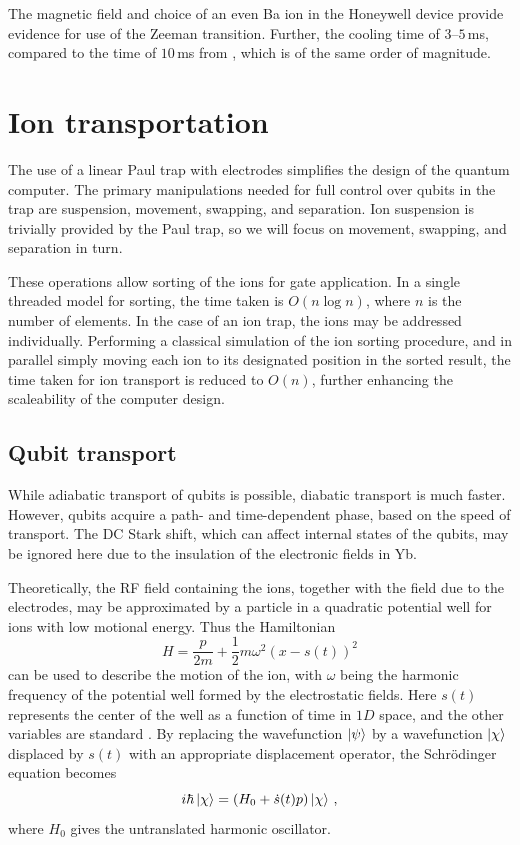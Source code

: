\documentclass[12pt,a4paper]{amsart}
\numberwithin{equation}{section}
\theoremstyle{plain}
\theoremstyle{definition}
\begin{document}
The magnetic field and choice of an even Ba ion in the Honeywell device provide evidence for use of the Zeeman transition. Further, the cooling time of $3$--$5\,$ms, compared to the time of $10\,$ms from \cite{rareEartCool}, which is of the same order of magnitude.



\section{Ion transportation}


The use of a linear Paul trap with electrodes simplifies the design of the quantum computer. The primary manipulations needed for full control over qubits in the trap are suspension, movement, swapping, and separation. Ion suspension is trivially provided by the Paul trap, so we will focus on movement, swapping, and separation in turn.


These operations allow sorting of the ions for gate application. In a single threaded model for sorting, the time taken is $O(n\log n)$, where $n$ is the number of elements. In the case of an ion trap, the ions may be addressed individually. Performing a classical simulation of the ion sorting procedure, and in parallel simply moving each ion to its designated position in the sorted result, the time taken for ion transport is reduced to $O(n)$, further enhancing the scaleability of the computer design.


\subsection{Qubit transport}


While adiabatic transport of qubits is possible, diabatic transport is much faster. However, qubits acquire a path- and time-dependent phase, based on the speed of transport. The DC Stark shift, which can affect internal states of the qubits, may be ignored here due to the insulation of the electronic fields in Yb.


Theoretically, the RF field containing the ions, together with the field due to the electrodes, may be approximated by a particle in a quadratic potential well for ions with low motional energy. Thus the Hamiltonian
$$H = \frac{p}{2m} + \frac{1}{2}m\omega^2 (x-s(t))^2$$
can be used to describe the motion of the ion, with $\omega$ being the harmonic frequency of the potential well formed by the electrostatic fields. Here $s(t)$ represents the center of the well as a function of time in $1D$ space, and the other variables are standard \cite{ioniTranErro}. By replacing the wavefunction $\ket{\psi}$ by a wavefunction $\ket{\chi}$ displaced by $s(t)$ with an appropriate displacement operator, the Schr{\"o}dinger equation becomes
$$i\hbar\ket{\chi} = (H_0 + \dot{s}(t)p)\ket{\chi}\,,$$
where $H_0$ gives the untranslated harmonic oscillator.
\end{document}
